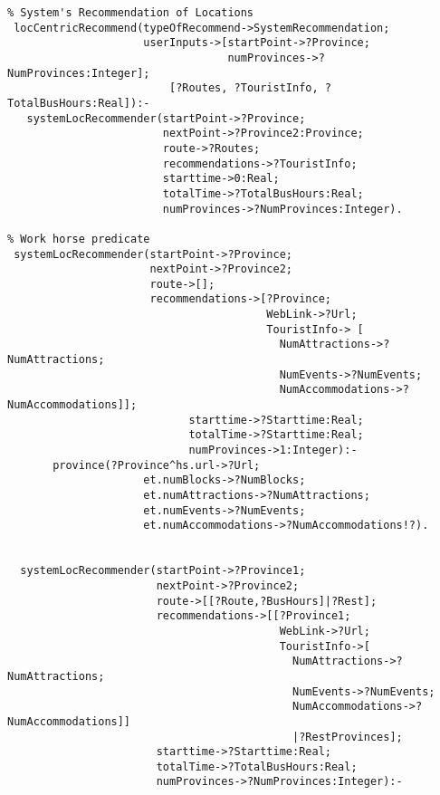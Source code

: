 \begin{verbatim}
% System's Recommendation of Locations
 locCentricRecommend(typeOfRecommend->SystemRecommendation;
                     userInputs->[startPoint->?Province; 
                                  numProvinces->?NumProvinces:Integer];
                         [?Routes, ?TouristInfo, ?TotalBusHours:Real]):-
   systemLocRecommender(startPoint->?Province; 
                        nextPoint->?Province2:Province; 
                        route->?Routes;
                        recommendations->?TouristInfo;
                        starttime->0:Real;
                        totalTime->?TotalBusHours:Real;
                        numProvinces->?NumProvinces:Integer).                                      

% Work horse predicate
 systemLocRecommender(startPoint->?Province; 
                      nextPoint->?Province2;  
                      route->[]; 
                      recommendations->[?Province;
                                        WebLink->?Url;
                                        TouristInfo-> [
                                          NumAttractions->?NumAttractions;
                                          NumEvents->?NumEvents;
                                          NumAccommodations->?NumAccommodations]];
                            starttime->?Starttime:Real;
                            totalTime->?Starttime:Real;
                            numProvinces->1:Integer):-
       province(?Province^hs.url->?Url;
                     et.numBlocks->?NumBlocks;
                     et.numAttractions->?NumAttractions;
                     et.numEvents->?NumEvents;
                     et.numAccommodations->?NumAccommodations!?).

 
  systemLocRecommender(startPoint->?Province1; 
                       nextPoint->?Province2; 
                       route->[[?Route,?BusHours]|?Rest];
                       recommendations->[[?Province1;
                                          WebLink->?Url;
                                          TouristInfo->[
                                            NumAttractions->?NumAttractions;
                                            NumEvents->?NumEvents; 
                                            NumAccommodations->?NumAccommodations]]
                                            |?RestProvinces];                                                                                          
                       starttime->?Starttime:Real;                                                         
                       totalTime->?TotalBusHours:Real;
                       numProvinces->?NumProvinces:Integer):-
 

\end{verbatim}
